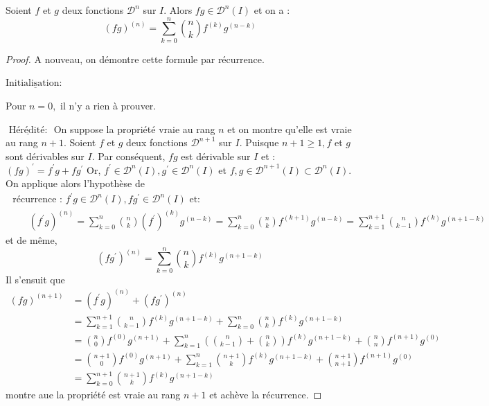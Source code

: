 \documentclass[12pt]{book}
\theoremstyle{definition}\newtheorem{dfn}{Définition}[chapter]
\theoremstyle{plain}\newtheorem{thm}{Théorème}[chapter]
\theoremstyle{plain}\newtheorem{prp}{Proposition}[chapter]
\theoremstyle{plain}\newtheorem{lem}{\bf Lemme}[chapter]
\theoremstyle{plain}\newtheorem{axm}{\bf Axiome}[chapter]
\theoremstyle{plain}\newtheorem{lmm}{\bf Lemme}[chapter]
\theoremstyle{plain}\newtheorem{exm}{\bf Example}[chapter]
\theoremstyle{plain}\newtheorem{cor}{\bf Corollaire}[chapter]
\theoremstyle{remark}\newtheorem{rem}{Remarque}[chapter]
\begin{document}
Soient $f$ et $g$ deux fonctions $\mathcal{D}^{n}$ sur $I$. Alors $f g \in \mathcal{D}^{n}(I)$ et on a :
$$\boxed{(fg)^{(n)}=\sum\limits_{k=0}^{n}\binom{n}{k} f^{(k)} g^{(n-k)}}$$
\begin{proof}
A nouveau, on démontre cette formule par récurrence. 

$\underline{\text {Initialisation: }}$

Pour $n=0,$ il n'y a rien à prouver.

$\underline{\text { Hérédité: }}$
On suppose la propriété vraie au rang $n$ et on montre qu'elle est vraie au rang $n+1 .$ Soient $f$ et $g$ deux fonctions $\mathcal{D}^{n+1}$ sur $I$. Puisque $n+1 \geqslant 1, f$ et $g$ sont dérivables sur $I .$ Par conséquent, $f g$ est 
dérivable sur $I$ et :
$(f g)^{\prime}=f^{\prime} g+f g^{\prime}$
Or, $f^{\prime} \in \mathcal{D}^{n}(I), g^{\prime} \in \mathcal{D}^{n}(I)$ et $f, g \in \mathcal{D}^{n+1}(I) \subset \mathcal{D}^{n}(I)$. On applique alors l'hypothèse de
$$
\begin{array}{l}
\text { récurrence : } f^{\prime} g \in \mathcal{D}^{n}(I), f g^{\prime} \in \mathcal{D}^{n}(I) \text { et: } \\
\qquad\left(f^{\prime} g\right)^{(n)}=\sum\limits_{k=0}^{n}\binom{n}{k}\left(f^{\prime}\right)^{(k)} g^{(n-k)}=\sum\limits_{k=0}^{n}\binom{n}{k}f^{(k+1)} g^{(n-k)}=\sum\limits_{k=1}^{n+1}\binom{n}{k-1}f^{(k)} g^{(n+1-k)}
\end{array}
$$
et de même,
$$
\left(f g^{\prime}\right)^{(n)}=\sum_{k=0}^{n}\binom{n}{k}f^{(k)} g^{(n+1-k)}
$$
Il s'ensuit que
$$
\begin{aligned}
(f g)^{(n+1)} &=\left(f^{\prime} g\right)^{(n)}+\left(f g^{\prime}\right)^{(n)} \\
&=\sum_{k=1}^{n+1}\binom{n}{k-1} f^{(k)} g^{(n+1-k)}+\sum_{k=0}^{n}\binom{n}{k}f^{(k)} g^{(n+1-k)} \\
&=\binom{n}{0}f^{(0)} g^{(n+1)}+\sum_{k=1}^{n}\left(\binom{n}{k-1}+\binom{n}{k}\right) f^{(k)} g^{(n+1-k)}+\binom{n}{n}
f^{(n+1)} g^{(0)} \\
&=\binom{n+1}{0}f^{(0)} g^{(n+1)}+\sum_{k=1}^{n}\binom{n+1}{k}f^{(k)} g^{(n+1-k)}+\binom{n+1}{n+1}f^{(n+1)} g^{(0)} \\
&=\sum_{k=0}^{n+1}\binom{n+1}{k}f^{(k)} g^{(n+1-k)}
\end{aligned}
$$
montre aue la propriété est vraie au rang $n+1$ et achève la récurrence.

\end{proof}
\end{document}
